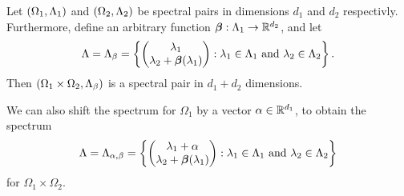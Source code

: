 \documentclass[../thesis.tex]{subfiles}
\begin{document}
\begin{lemma}\label{lem:beta_shift}
    Let $(\Omega_1,\Lambda_1)$ and $(\Omega_2,\Lambda_2)$ be spectral pairs in dimensions $d_1$ and $d_2$ respectivly. Furthermore, define an arbitrary function $\bm{\beta}: \Lambda_1 \rightarrow \mathbb{R}^{d_2}$, and let
    \begin{equation}
        \Lambda = \Lambda_\beta
        = \left\{\begin{pmatrix}
            \lambda_1 \\
            \lambda_2+\bm{\beta}(\lambda_1)
            \end{pmatrix}
        : \lambda_1 \in \Lambda_1 \text{ and } \lambda_2 \in \Lambda_2\right\}.
    \end{equation}
    Then $(\Omega_1 \times \Omega_2,\Lambda_\beta)$ is a spectral pair in $d_1+d_2$ dimensions. 
\end{lemma}
\begin{remark} %
    We can also shift the spectrum for $\Omega_1$ by a vector $\alpha \in \mathbb{R}^{d_1}$, to obtain the spectrum 
    \begin{equation*}
        \Lambda = \Lambda_{\alpha,\beta} 
        = \left\{\begin{pmatrix}
            \lambda_1 +\alpha\\
            \lambda_2+\bm{\beta}(\lambda_1)
            \end{pmatrix}
        : \lambda_1 \in \Lambda_1 \text{ and } \lambda_2 \in \Lambda_2\right\}
    \end{equation*}
    for $\Omega_1 \times \Omega_2$.
\end{remark}
\end{document}
